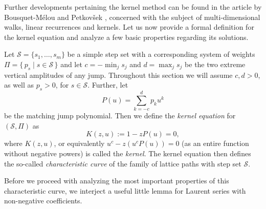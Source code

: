 Further developments pertaining the kernel method can be found in the article by Bousquet-Mélou and Petkovšek \cite{LinearRecurrences}, concerned with the subject of multi-dimensional walks, linear recurrences and kernels. 
Let us now provide a formal definition for the kernel equation and analyze a few basic properties regarding its solutions.


\begin{definition}
  Let $\mathcal{S} = \{s_1,\dots,s_m\}$ be a simple step set with a corresponding system of weights $\Pi = \{\, p_s\mid s \in \mathcal{S} \,\}$ and let $c = - \min_j s_j$ and $d = \max_j s_j$ be the two extreme vertical amplitudes of any jump. Throughout this section we will assume $c, d > 0$, as well as $p_s > 0$, for $s \in \mathcal{S}$. Further, let 
  $$
    P(u) = \sum_{k=-c}^d p_k u^k
  $$ 
  be the matching jump polynomial.
  Then we define the \textit{kernel equation} for $(\mathcal{S},\Pi)$ as 
  \begin{equation*}
    K(z,u) := 1 - zP(u) = 0,
  \end{equation*}
  where $K(z,u)$, or equivalently $u^c - z(u^cP(u)) = 0$ (as an entire function without negative powers) is called the \textit{kernel}. 
  The kernel equation then defines the so-called \textit{characteristic curve} of the family of lattice paths with step set $\mathcal{S}$.
\end{definition}

Before we proceed with analyzing the most important properties of this characteristic curve, we interject a useful little lemma for Laurent series with non-negative coefficients.

